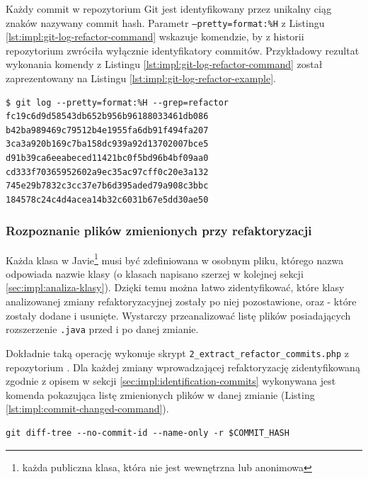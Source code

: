 \documentclass[12pt]{report}
\begin{document}
Każdy commit w repozytorium Git jest identyfikowany przez unikalny ciąg znaków nazywany commit hash. Parametr \texttt{--pretty=format:\%H} z Listingu \ref{lst:impl:git-log-refactor-command} wskazuje komendzie, by z historii repozytorium zwróciła wyłącznie identyfikatory commitów. Przykładowy rezultat wykonania komendy z Listingu \ref{lst:impl:git-log-refactor-command} został zaprezentowany na Listingu \ref{lst:impl:git-log-refactor-example}.

\begin{lstlisting}[frame=single,caption={Przykłaodowy rezultat wyszukania w repozytorium commitów z zadanym słowem kluczowym w commit message},captionpos=b,label={lst:impl:git-log-refactor-example}]
$ git log --pretty=format:%H --grep=refactor
fc19c6d9d58543db652b956b96188033461db086
b42ba989469c79512b4e1955fa6db91f494fa207
3ca3a920b169c7ba158dc939a92d13702007bce5
d91b39ca6eeabeced11421bc0f5bd96b4bf09aa0
cd333f70365952602a9ec35ac97cff0c20e3a132
745e29b7832c3cc37e7b6d395aded79a908c3bbc
184578c24c4d4acea14b32c6031b67e5dd30ae50
\end{lstlisting}

\subsubsection{Rozpoznanie plików zmienionych przy refaktoryzacji}
Każda klasa w Javie\footnote{każda publiczna klasa, która nie jest wewnętrzna lub anonimowa} musi być zdefiniowana w osobnym pliku, którego nazwa odpowiada nazwie klasy (o klasach napisano szerzej w kolejnej sekcji \ref{sec:impl:analiza-klasy}). Dzięki temu można łatwo zidentyfikować, które klasy analizowanej zmiany refaktoryzacyjnej zostały po niej pozostawione, oraz - które zostały dodane i usunięte. Wystarczy przeanalizować listę plików posiadających rozszerzenie \texttt{.java} przed i po danej zmianie.

Dokładnie taką operację wykonuje skrypt \texttt{2\_extract\_refactor\_commits.php} z repozytorium \cite{fracz:refactor-extractor}. Dla każdej zmiany wprowadzającej refaktoryzację zidentyfikowaną zgodnie z opisem w sekcji \ref{sec:impl:identification-commits} wykonywana jest komenda pokazująca listę zmienionych plików w danej zmianie (Listing \ref{lst:impl:commit-changed-command}).

\begin{lstlisting}[frame=single,caption={Komenda prezentująca listę zmienionych plików w danym commicie},captionpos=b,label={lst:impl:commit-changed-command}]
git diff-tree --no-commit-id --name-only -r $COMMIT_HASH
\end{lstlisting}
\end{document}
